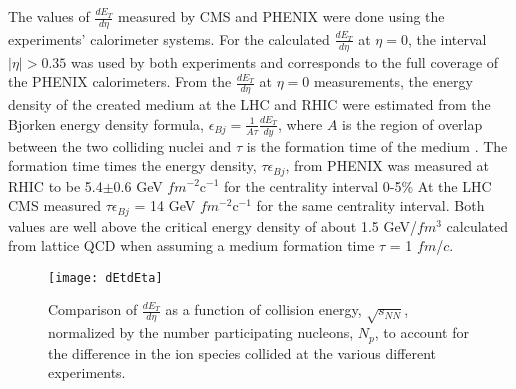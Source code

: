     The values of $\frac{dE_{T}}{d\eta}$ measured by CMS \cite{cmsEt} and PHENIX 
      \cite{phenixDeDeta} were done using the experiments' calorimeter 
      systems.
    For the calculated $\frac{dE_{T}}{d\eta}$ at $\eta = 0$, the interval 
      $|\eta| > 0.35$ was used by both experiments and corresponds to the full
      coverage of the PHENIX calorimeters. 
    From the $\frac{dE_{T}}{d\eta}$ at $\eta = 0$ measurements, the energy 
      density of the created medium at the LHC and RHIC were estimated from the
      Bjorken energy density formula, 
    $\epsilon_{Bj}=\frac{1}{A\tau}\frac{dE_{T}}{dy}$, where $A$ is the region
      of overlap between the two colliding nuclei and $\tau$ is the formation
      time of the medium \cite{bjEdense}.
    The formation time times the energy density, $\tau\epsilon_{Bj}$, 
      from PHENIX was measured at RHIC to be 5.4$\pm$0.6 GeV $fm$$^{-2}$c$^{-1}$ 
      for the centrality interval 0-5\% 
    At the LHC CMS measured $\tau\epsilon_{Bj}$ = 14 GeV $fm$$^{-2}$c$^{-1}$ 
      for the same centrality interval.
    Both values are well above the critical energy density of about 1.5 GeV/$fm$$^{3}$ 
      calculated from lattice QCD when assuming a medium formation time $\tau$ 
      = 1 $fm$/$c$.
      \begin{figure}[!Hhbt]
        \centering
        \texttt{[image: dEtdEta]}
        \caption{Comparison of $\frac{dE_{T}}{d\eta}$ as a function of 
          collision energy, $\sqrt{s_{NN}}$, normalized by the number 
          participating nucleons, $N_{p}$, to account for the difference in 
          the ion species collided at the various different experiments.}
        \label{fig:dEtdEta}
      \end{figure}

